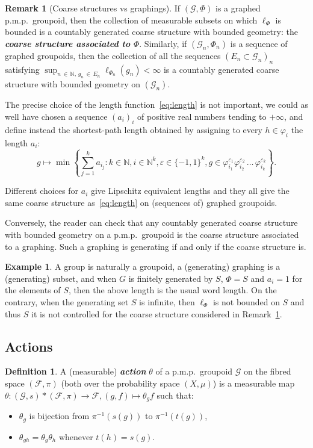 \documentclass[10pt]{amsart}
\theoremstyle{definition}
\newtheorem{rema}[cdrthm]{Remark}
\newtheorem{defi}[cdrthm]{Definition}
\newtheorem{exam}[cdrthm]{Example}
\newcommand{\defin}[1]{\textbf{\emph{#1}}}
\newcommand{\Nmath}{\mathbb{N}}
\newcommand{\cg}{\mathcal{G}}
\newcommand{\cf}{\mathcal{F}}
\newcommand{\ph}{\varphi}
\newcommand{\pmp}{p.m.p.\ }
\begin{document}
\begin{rema}[Coarse structures vs graphings]\label{remark:coarse_structure}
If $(\cg,\Phi)$ is a graphed \pmp groupoid, then the collection of measurable subsets on which $\ell_\Phi$ is bounded is a countably generated coarse structure with bounded geometry: the
\defin{coarse structure associated to $\Phi$}. Similarly, if $(\cg_n,\Phi_n)$ is a sequence of graphed groupoids, then the collection of all the sequences $(E_n \subset \cg_n)_n$ satisfying $\sup_{n\,\in\,\Nmath,\,g_n\,\in \,E_n} \ell_{\Phi_n}(g_n)<\infty$ is a countably generated coarse structure with bounded geometry on $(\cg_n)$.

The precise choice of the length function~\eqref{eq:length} is not important, we could as well have chosen a sequence $(a_i)_i$ of positive real numbers tending to $+\infty$, and define instead the shortest-path length obtained by assigning to every $h \in \ph_i$ the length $a_i$:
\[
g\mapsto \min\left\{ \sum_{j=1}^k a_{i_j} : k \in \Nmath, i \in \Nmath^k, \varepsilon \in \{-1,1\}^k, g \in \ph_{i_1}^{\varepsilon_1}\ph_{i_2}^{\varepsilon_2}\,\dots \,\ph_{i_k}^{\varepsilon_k} \right\}.
\]

Different choices for $a_i$ give Lipschitz equivalent lengths and they all give the same coarse structure as~\eqref{eq:length} on (sequences of) graphed groupoids.

Conversely, the reader can check that any countably generated coarse structure with bounded geometry on a \pmp groupoid is the coarse structure associated to a graphing. Such a graphing is generating if and only if the coarse structure is.
\end{rema}
\begin{exam}
A group is naturally a groupoid, a (generating) graphing is a (generating) subset, and when $G$ is finitely generated by $S$, $\Phi=S$ and $a_i=1$ for the elements of $S$, then the above length is the usual word length. On the contrary, when the generating set $S$ is infinite, then $\ell_{\Phi}$ is not bounded on $S$ and thus $S$ it is not controlled for the coarse structure considered in Remark~\ref{remark:coarse_structure}.
\end{exam}

\subsection{Actions}\label{sec:actions}
\begin{defi}
A (measurable)
\defin{action} $\theta$ of a \pmp groupoid $\cg$ on the fibred space $(\cf,\pi)$ (both over the probability space $(X,\mu)$) is a measurable map $\theta: (\cg,s) \ast (\cf,\pi) \to \cf, (g,f)\mapsto \theta_g f$ such that:
\begin{itemize}
\item $\theta_g$ is bijection from $\pi^{-1}(s(g))$ to $\pi^{-1}(t(g))$,
\item $\theta_{gh}=\theta_g\theta_h$ whenever $t(h)=s(g)$.
\end{itemize}
\end{defi}
\end{document}
